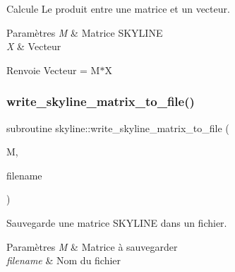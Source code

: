 Calcule Le produit entre une matrice et un vecteur. 


\begin{DoxyParams}{Paramètres}
{\em M} & Matrice S\+K\+Y\+L\+I\+NE \\
\hline
{\em X} & Vecteur \\
\hline
\end{DoxyParams}
\begin{DoxyReturn}{Renvoie}
Vecteur = M$\ast$X 
\end{DoxyReturn}
\mbox{\label{namespaceskyline_a3377a8391ad2d61659689fc8c4130bdc}} 
\subsubsection{\texorpdfstring{write\+\_\+skyline\+\_\+matrix\+\_\+to\+\_\+file()}{write\_skyline\_matrix\_to\_file()}}
{\footnotesize\ttfamily subroutine skyline\+::write\+\_\+skyline\+\_\+matrix\+\_\+to\+\_\+file (\begin{DoxyParamCaption}\item[{type (\hyperlink{structskyline_1_1skyline__matrix}{skyline\+\_\+matrix})}]{M,  }\item[{character(len=$\ast$), intent(in)}]{filename }\end{DoxyParamCaption})}



Sauvegarde une matrice S\+K\+Y\+L\+I\+NE dans un fichier. 


\begin{DoxyParams}{Paramètres}
{\em M} & Matrice à sauvegarder \\
\hline
{\em filename} & Nom du fichier \\
\hline
\end{DoxyParams}

